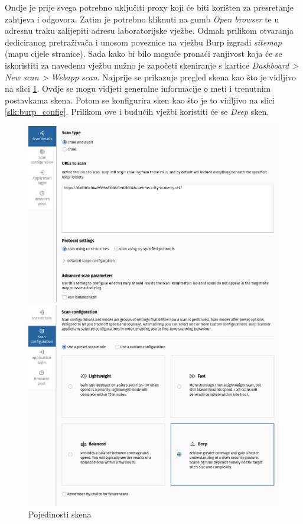 Ondje je prije svega potrebno uključiti proxy koji će biti korišten za presretanje zahtjeva i odgovora. Zatim je potrebno kliknuti na gumb \textit{Open browser} te u adresnu traku zalijepiti adresu laboratorijske
vježbe. Odmah prilikom otvaranja dediciranog pretraživača i unosom poveznice na vježbu Burp izgradi \textit{sitemap} (mapu cijele stranice).
Sada kako bi bilo moguće pronaći ranjivost koja će se iskoristiti za navedenu vježbu nužno je započeti skeniranje s kartice \textit{Dashboard > New scan > Webapp scan}.
Najprije se prikazuje pregled skena kao što je vidljivo na slici \ref{slk:burp_pojed}. Ovdje se mogu vidjeti generalne informacije o meti i trenutnim postavkama skena.
Potom se konfigurira sken kao što je to vidljivo na slici \ref{slk:burp_config}. Prilikom ove i budućih vježbi koristiti će se \textit{Deep} sken.
\begin{figure}[H]
    \centering
    \begin{minipage}[b]{0.46\textwidth}
      \centering
      \includegraphics[width=\textwidth]{slike/scan_det.png}
      \caption{Pojedinosti skena}
      \label{slk:burp_pojed}
    \end{minipage}
    \hspace{0.05\textwidth} %
    \begin{minipage}[b]{0.47\textwidth}
      \centering
      \includegraphics[width=\textwidth]{slike/scan_config_burp.png}

\end{minipage}
\end{figure}
